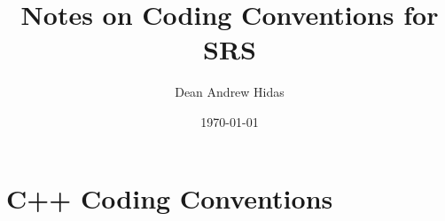 \documentclass{article}
\title{Notes on Coding Conventions for SRS}
\author{Dean Andrew Hidas}
\date{\today}
\begin{document}
\maketitle

\section{C++ Coding Conventions}
\end{document}
